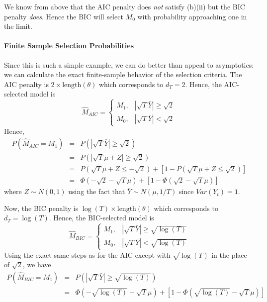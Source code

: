 \documentclass[12pt]{article}
\theoremstyle{definition}
\begin{document}
We know from above that the AIC penalty does \emph{not} satisfy (b)(ii) but the BIC penalty \emph{does}. Hence the BIC will select $M_0$ with probability approaching one in the limit.

\paragraph{Finite Sample Selection Probabilities} Since this is such a simple example, we can do better than appeal to asymptotics: we can calculate the exact finite-sample behavior of the selection criteria. The AIC penalty is $2 \times \mbox{length}(\theta)$ which corresponds to $d_T = 2$. Hence, the AIC-selected model is
	$$\widehat{M}_{AIC} = \left\{\begin{array}
		{cc} M_1, &|\sqrt{T}\bar{Y}| \geq \sqrt{2} \\
		M_0, & |\sqrt{T} \bar{Y}| < \sqrt{2}
	\end{array} \right.$$
Hence,
	\begin{eqnarray*}
		P\left(\widehat{M}_{AIC} = M_1\right) &=& P\left(\left|\sqrt{T}\bar{Y} \right| \geq \sqrt{2}  \right)\\
		&=& P\left(\left|\sqrt{T}\mu + Z\right| \geq \sqrt{2}  \right)\\
		&=& P\left(\sqrt{T}\mu + Z \leq -\sqrt{2}\right) + \left[1 - P\left(\sqrt{T} \mu +Z \leq \sqrt{2}\right) \right]\\
			&=& \Phi\left(-\sqrt{2} - \sqrt{T}\mu\right) + \left[1 -  \Phi\left(\sqrt{2} - \sqrt{T} \mu \right)\right]
	\end{eqnarray*}
where $Z \sim N(0,1)$ using the fact that $\bar{Y} \sim N(\mu, 1/T)$ since $Var(Y_t)=1$.

Now, the BIC penalty is $\log(T)\times \mbox{length}(\theta)$ which corresponds to $d_T = \log(T)$. Hence, the BIC-selected model is
	$$\widehat{M}_{BIC} = \left\{\begin{array}
		{cc} M_1, & |\sqrt{T}\bar{Y} | \geq \sqrt{\log(T)} \\
		M_0, & |\sqrt{T} \bar{Y}| < \sqrt{\log(T)}
	\end{array} \right.$$
Using the exact same steps as for the AIC except with $\sqrt{\log(T)}$ in the place of $\sqrt{2}$, we have
	\begin{eqnarray*}
		P\left(\widehat{M}_{BIC} = M_1\right) &=& P\left(\left|\sqrt{T}\bar{Y} \right| \geq \sqrt{\log(T)}  \right)\\
			&=& \Phi\left(-\sqrt{\log(T)} - \sqrt{T}\mu\right) + \left[1 -  \Phi\left(\sqrt{\log(T)} - \sqrt{T} \mu \right)\right]
	\end{eqnarray*}
\end{document}

